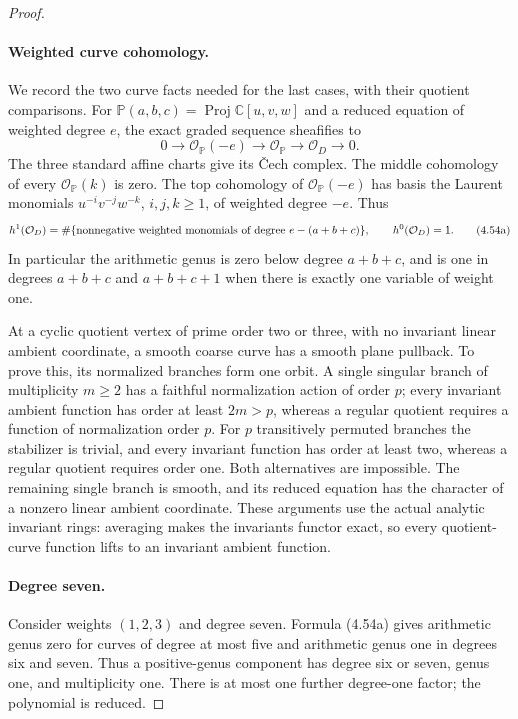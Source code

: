 \begin{proof}
\paragraph{Weighted curve cohomology.}
We record the two curve facts needed for the last
cases, with their quotient comparisons. For
$\mathbb P(a,b,c)=\operatorname{Proj}\mathbb C[u,v,w]$
and a reduced equation of weighted degree $e$,
the exact graded sequence sheafifies to
\[
 0\longrightarrow\mathcal O_{\mathbb P}(-e)
 \longrightarrow\mathcal O_{\mathbb P}
 \longrightarrow\mathcal O_D\longrightarrow0.
\]
The three standard affine charts give its \v Cech
complex. The middle cohomology of every
$\mathcal O_{\mathbb P}(k)$ is zero. The top
cohomology of $\mathcal O_{\mathbb P}(-e)$ has
basis the Laurent monomials $u^{-i}v^{-j}w^{-k}$,
$i,j,k\ge1$, of weighted degree $-e$. Thus
\[
 h^1(\mathcal O_D)=
 \#\{\hbox{nonnegative weighted monomials of degree }
                         e-(a+b+c)\},
 \qquad h^0(\mathcal O_D)=1.                         \tag{4.54a}
\]
In particular the arithmetic genus is zero below
degree $a+b+c$, and is one in degrees $a+b+c$
and $a+b+c+1$ when there is exactly one variable
of weight one.

At a cyclic quotient vertex of prime order two
or three, with no invariant linear ambient
coordinate, a smooth coarse curve has a smooth
plane pullback. To prove this, its normalized
branches form one orbit. A single singular
branch of multiplicity $m\ge2$ has a faithful
normalization action of order $p$; every invariant
ambient function has order at least $2m>p$,
whereas a regular quotient requires a function
of normalization order $p$. For $p$ transitively
permuted branches the stabilizer is trivial,
and every invariant function has order at least
two, whereas a regular quotient requires order
one. Both alternatives are impossible. The
remaining single branch is smooth, and its
reduced equation has the character of a nonzero
linear ambient coordinate. These arguments
use the actual analytic invariant rings:
averaging makes the invariants functor exact,
so every quotient-curve function lifts to an
invariant ambient function.

\paragraph{Degree seven.}
Consider weights $(1,2,3)$ and degree seven.
Formula (4.54a) gives arithmetic genus zero for
curves of degree at most five and arithmetic
genus one in degrees six and seven. Thus a
positive-genus component has degree six or
seven, genus one, and multiplicity one. There
is at most one further degree-one factor;
the polynomial is reduced.


\end{proof}
